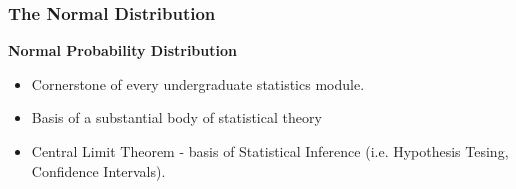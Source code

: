 \documentclass[MAIN.tex]{subfiles}
\begin{document}
\begin{frame}
\frametitle{The Normal Distribution}
\textbf{Normal Probability Distribution}
\large
\begin{itemize}
\item Cornerstone of every undergraduate statistics module.
\item Basis of a substantial body of statistical theory
\item Central Limit Theorem - basis of Statistical Inference (i.e. Hypothesis Tesing, Confidence Intervals).

\end{itemize}
\end{frame}
\end{document}

